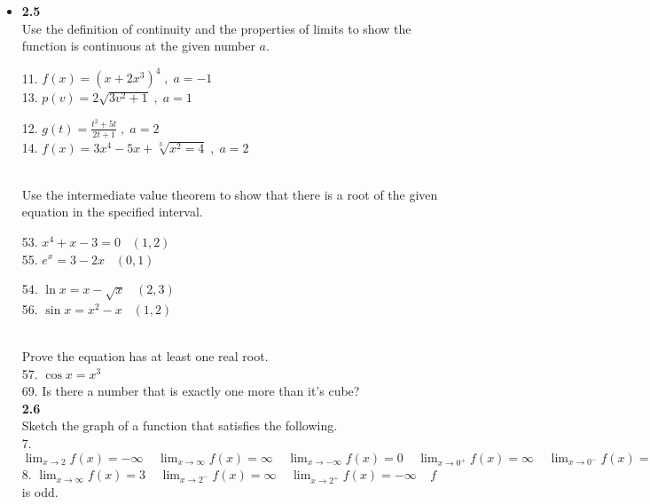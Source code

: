 \documentclass{letter}
\begin{document}
	\begin{itemize}
		\item[] \textbf{2.5}\\
		
		Use the definition of continuity and the properties of limits to show the function is continuous at the given number $a$.\\
		\begin{minipage}[t]{0.5\textwidth}
			11. $f(x) = (x+2x^3)^4\;, \; a = -1$\\
			13. $p(v) = 2\sqrt{3v^2 + 1}\;, \; a = 1$
		\end{minipage}
		\begin{minipage}[t]{0.5\textwidth}
			12. $g(t) = \frac{t^2 + 5t}{2t + 1}\;, \; a = 2$\\
			14. $f(x) = 3x^4 - 5x + \sqrt[3]{x^2 = 4}\;, \; a = 2$\\
		\end{minipage}\\
		
		Use the intermediate value theorem to show that there is a root of the given equation in the specified interval.\\
		\begin{minipage}[t]{0.5\textwidth}
			53. $x^4 + x - 3 = 0 \;\;\; (1, 2)$\\
			55. $e^x = 3 - 2x \;\;\; (0, 1)$\\
		\end{minipage}
		\begin{minipage}[t]{0.5\textwidth}
			54. $\ln x = x - \sqrt x \;\;\; (2, 3)$\\
			56. $\sin x = x^2 - x \;\;\; (1, 2)$
		\end{minipage}\\
		
		Prove the equation has at least one real root.\\
		57. $\cos x = x^3$\\
		
		69. Is there a number that is exactly one more than it's cube?\\
		
		\textbf{2.6}\\
		
		Sketch the graph of a function that satisfies the following.\\
		7. $\displaystyle \lim_{x \to 2} f(x) = -\infty \;\;\;\; \lim_{x \to \infty} f(x) = \infty \;\;\;\; \lim_{x \to -\infty} f(x) = 0 \;\;\;\; \lim_{x \to 0^+} f(x) = \infty \;\;\;\; \lim_{x \to 0^-} f(x) = -\infty$\\
		8. $\displaystyle \lim_{x \to \infty} f(x) = 3 \;\;\;\; \lim_{x \to 2^-} f(x) = \infty \;\;\;\; \lim_{x \to 2^+} f(x) = - \infty \;\;\;\; f$ is odd.\\
		

\end{itemize}
\end{document}

